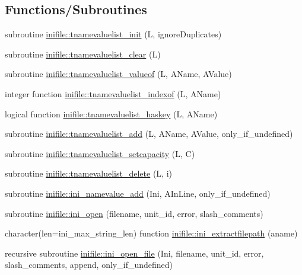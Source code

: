 \subsection*{Functions/\+Subroutines}
\begin{DoxyCompactItemize}
\item 
subroutine \mbox{\hyperlink{namespaceinifile_a1b5283277321bb0c12d8495bd16c23be}{inifile\+::tnamevaluelist\+\_\+init}} (L, ignore\+Duplicates)
\item 
subroutine \mbox{\hyperlink{namespaceinifile_a06106a843a985f0a3a97ecff6fb2b339}{inifile\+::tnamevaluelist\+\_\+clear}} (L)
\item 
subroutine \mbox{\hyperlink{namespaceinifile_a7381759693093e431b8e0aabf6e4b0f2}{inifile\+::tnamevaluelist\+\_\+valueof}} (L, A\+Name, A\+Value)
\item 
integer function \mbox{\hyperlink{namespaceinifile_a040f1b3c4c75c262385aa1452ec39343}{inifile\+::tnamevaluelist\+\_\+indexof}} (L, A\+Name)
\item 
logical function \mbox{\hyperlink{namespaceinifile_af36608910f6418a922996326dd9a97e3}{inifile\+::tnamevaluelist\+\_\+haskey}} (L, A\+Name)
\item 
subroutine \mbox{\hyperlink{namespaceinifile_a71aeaf793bb8c4435154a6e8e52bdfaf}{inifile\+::tnamevaluelist\+\_\+add}} (L, A\+Name, A\+Value, only\+\_\+if\+\_\+undefined)
\item 
subroutine \mbox{\hyperlink{namespaceinifile_a761b93f34948645a73d7311a0dd5f833}{inifile\+::tnamevaluelist\+\_\+setcapacity}} (L, C)
\item 
subroutine \mbox{\hyperlink{namespaceinifile_afbd40722f8a5cfa2f23ed35ed7645466}{inifile\+::tnamevaluelist\+\_\+delete}} (L, i)
\item 
subroutine \mbox{\hyperlink{namespaceinifile_a609f356a961dccd80c9ae97cef1ec582}{inifile\+::ini\+\_\+namevalue\+\_\+add}} (Ini, A\+In\+Line, only\+\_\+if\+\_\+undefined)
\item 
subroutine \mbox{\hyperlink{namespaceinifile_a02e6bd0abca420cf13df98658ac047ba}{inifile\+::ini\+\_\+open}} (filename, unit\+\_\+id, error, slash\+\_\+comments)
\item 
character(len=ini\+\_\+max\+\_\+string\+\_\+len) function \mbox{\hyperlink{namespaceinifile_a363a92da96b45fce841b0f4dfb2f3fd9}{inifile\+::ini\+\_\+extractfilepath}} (aname)
\item 
recursive subroutine \mbox{\hyperlink{namespaceinifile_a18f4ff3cc821f6e027b4aefa829f4b41}{inifile\+::ini\+\_\+open\+\_\+file}} (Ini, filename, unit\+\_\+id, error, slash\+\_\+comments, append, only\+\_\+if\+\_\+undefined)

\end{DoxyCompactItemize}
